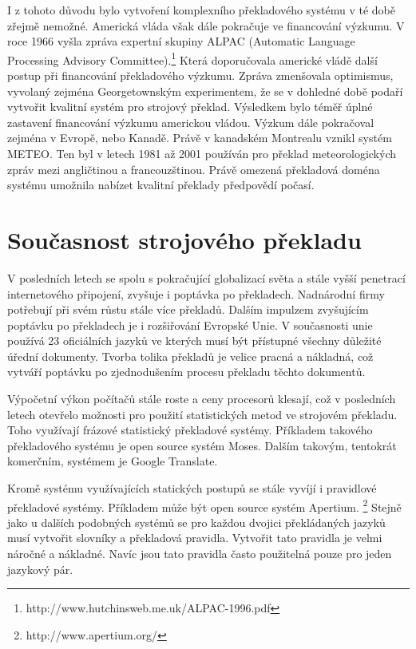 \documentclass[12pt,a4paper]{report}
\begin{document}
I z tohoto důvodu bylo vytvoření komplexního překladového systému v té době zřejmě nemožné. Americká vláda však dále pokračuje ve financování výzkumu. V roce 1966 vyšla zpráva expertní skupiny ALPAC (Automatic Language Processing Advisory Committee).\footnote{http://www.hutchinsweb.me.uk/ALPAC-1996.pdf} Která doporučovala americké vládě další postup při financování překladového výzkumu. Zpráva zmenšovala optimismus, vyvolaný zejména Georgetownským experimentem, že se v dohledné době podaří vytvořit kvalitní systém pro strojový překlad. Výsledkem bylo téměř úplné zastavení financování výzkumu americkou vládou. Výzkum dále pokračoval zejména v Evropě, nebo Kanadě. Právě v kanadském Montrealu vznikl systém METEO. Ten byl v letech 1981 až 2001 používán pro překlad meteorologických zpráv mezi angličtinou a francouzštinou. Právě omezená překladová doména systému umožnila nabízet kvalitní překlady předpovědí počasí.

\section{Současnost strojového překladu}
V posledních letech se spolu s pokračující globalizací světa a stále vyšší penetrací internetového připojení, zvyšuje i poptávka po překladech. Nadnárodní firmy potřebují při svém růstu stále více překladů. Dalším impulzem zvyšujícím poptávku po překladech je i rozšiřování Evropské Unie. V současnosti unie používá 23 oficiálních jazyků ve kterých musí být přístupné všechny důležité úřední dokumenty. Tvorba tolika překladů je velice pracná a nákladná, což vytváří poptávku po zjednodušením procesu překladu těchto dokumentů.

Výpočetní výkon počítačů stále roste a ceny procesorů klesají, což v posledních letech otevřelo možnosti pro použití statistických metod ve strojovém překladu. Toho využívají frázové statistický překladové systémy. Příkladem takového překladového systému je open source systém Moses. Dalším takovým, tentokrát komerčním, systémem je Google Translate.

Kromě systému využívajících statických postupů se stále vyvíjí i pravidlové překladové systémy. Příkladem může být open source systém Apertium. \footnote{http://www.apertium.org/} Stejně jako u dalších podobných systémů se pro každou dvojici překládaných jazyků musí vytvořit slovníky a překladová pravidla. Vytvořit tato pravidla je velmi náročné a nákladné. Navíc jsou tato pravidla často použitelná pouze pro jeden jazykový pár.
\end{document}
